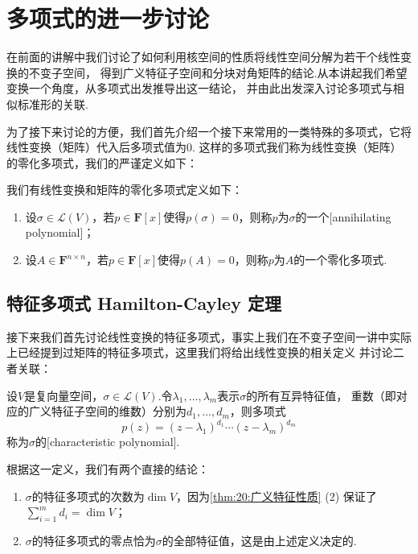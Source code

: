 \chapter{多项式的进一步讨论}

在前面的讲解中我们讨论了如何利用核空间的性质将线性空间分解为若干个线性变换的不变子空间，
得到广义特征子空间和分块对角矩阵的结论.从本讲起我们希望变换一个角度，从多项式出发推导出这一结论，
并由此出发深入讨论多项式与相似标准形的关联.

为了接下来讨论的方便，我们首先介绍一个接下来常用的一类特殊的多项式，它将线性变换（矩阵）代入后多项式值为0. 
这样的多项式我们称为线性变换（矩阵）的零化多项式，我们的严谨定义如下：
\begin{definition}
    我们有线性变换和矩阵的零化多项式定义如下：
    \begin{enumerate}
        \item 设$\sigma\in \mathcal{L}(V)$，若$p\in\mathbf{F}[x]$使得$p(\sigma)=0$，则称$p$为$\sigma$的一个[annihilating polynomial]；
        \item 设$A\in\mathbf{F}^{n\times n}$，若$p\in\mathbf{F}[x]$使得$p(A)=0$，则称$p$为$A$的一个零化多项式.
    \end{enumerate}
\end{definition}

\section{特征多项式 \quad Hamilton-Cayley 定理}
接下来我们首先讨论线性变换的特征多项式，事实上我们在不变子空间一讲中实际上已经提到过矩阵的特征多项式，这里我们将给出线性变换的相关定义
并讨论二者关联：
\begin{definition}
    设$V$是复向量空间，$\sigma\in \mathcal{L}(V)$.令$\lambda_1,\ldots,\lambda_m$表示$\sigma$的所有互异特征值，
    重数（即对应的广义特征子空间的维数）分别为$d_1,\ldots,d_m$，则多项式
    \begin{equation}\label{eq:21:线性变换特征多项式}
        p(z)=(z-\lambda_1)^{d_1}\cdots(z-\lambda_m)^{d_m}
    \end{equation}
    称为$\sigma$的[characteristic polynomial].
\end{definition}

根据这一定义，我们有两个直接的结论：
\begin{enumerate}
    \item $\sigma$的特征多项式的次数为$\dim V$，因为\autoref{thm:20:广义特征性质} (2) 保证了$\sum\limits_{i=1}^m d_i=\dim V$；
    \item $\sigma$的特征多项式的零点恰为$\sigma$的全部特征值，这是由上述定义决定的.
\end{enumerate}

